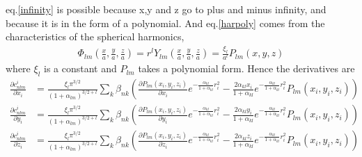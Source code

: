 \documentclass[10pt]{article}
\begin{document}
eq.\ref{infinity} is possible because x,y and z go to plus and minus infinity, and because it is in the form of a polynomial. And eq.\ref{harpoly} comes from the characteristics of the spherical harmonics,
\begin{align}
\Phi_{lm}(\frac{x}{a},\frac{y}{a},\frac{z}{a}) = r^l Y_{lm}(\frac{x}{a},\frac{y}{a},\frac{z}{a})  = \frac{\xi_l}{a^l} P_{lm}(x,y,z)
\end{align}
where $\xi_l$ is a constant and $P_{lm}$ takes a polynomial form. Hence the derivatives are
\begin{align}
         \frac{\partial c^i_{nlm}}{ \partial x_i} &=  \frac{\xi_l\pi^{3/2}}{(1+\alpha_{lm})^{3/2 + l}}\sum_k \beta_{nk} \left( \frac{\partial P_{lm}(x_i, y_i, z_i)}{\partial x_i} e^{-\frac{\alpha_{kl}}{1+\alpha_{kl}} r^2_i} - \frac{2\alpha_{kl}x_i}{1+\alpha_{kl} }e^{-\frac{\alpha_{kl}}{1+\alpha_{kl}} r^2_i} P_{lm}(x_i, y_i, z_i)  \right) \\
         \frac{\partial c^i_{nlm}}{ \partial y_i} &=  \frac{\xi_l\pi^{3/2}}{(1+\alpha_{lm})^{3/2 + l}}\sum_k \beta_{nk} \left( \frac{\partial P_{lm}(x_i, y_i, z_i)}{\partial y_i} e^{-\frac{\alpha_{kl}}{1+\alpha_{kl}} r^2_i} - \frac{2\alpha_{kl}y_i}{1+\alpha_{kl} }e^{-\frac{\alpha_{kl}}{1+\alpha_{kl}} r^2_i} P_{lm}(x_i, y_i, z_i)  \right) \\
         \frac{\partial c^i_{nlm}}{ \partial z_i} &=  \frac{\xi_l\pi^{3/2}}{(1+\alpha_{lm})^{3/2 + l}}\sum_k \beta_{nk} \left( \frac{\partial P_{lm}(x_i, y_i, z_i)}{\partial z_i} e^{-\frac{\alpha_{kl}}{1+\alpha_{kl}} r^2_i} - \frac{2\alpha_{kl}z_i}{1+\alpha_{kl} }e^{-\frac{\alpha_{kl}}{1+\alpha_{kl}} r^2_i} P_{lm}(x_i, y_i, z_i)  \right)
\end{align}
\end{document}
